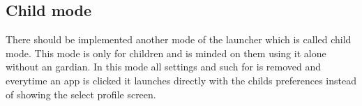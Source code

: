 \subsection{Child mode}
\label{backlog:child_mode}

There should be implemented another mode of the launcher which is called child mode. This mode is only for children and is minded on them using it alone without an gardian. In this mode all settings and such for is removed and everytime an app is clicked it launches directly with the childs preferences instead of showing the select profile screen.